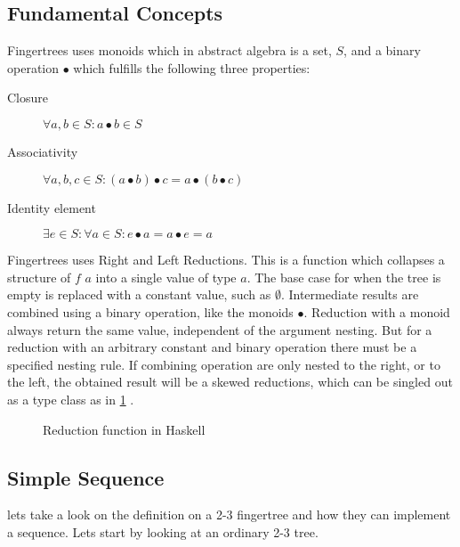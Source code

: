 \subsection{Fundamental Concepts}

Fingertrees uses monoids which in abstract algebra is a set, $S$, and a binary
operation $\bullet$ which fulfills the following
three properties:
\begin{description}
\item[Closure] $\forall a,b \in S: a \bullet b \in S$
\item[Associativity] $\forall a,b,c \in S: (a \bullet b) \bullet c = a \bullet
    (b \bullet c)$ 
\item[Identity element] $\exists e \in S: \forall a \in S: e \bullet a = a
    \bullet e = a$
\end{description}

Fingertrees uses Right and Left Reductions. This is a function which
collapses a structure of $f$ $a$ into a single value of type $a$. The base case
for when the tree is empty is replaced with a constant value, such as 
$\emptyset$. Intermediate results are combined using a binary operation, like
the monoids $\bullet$. Reduction with a monoid always return the same value,
independent of the argument nesting. But for a reduction with an arbitrary
constant and binary operation there must be a specified nesting rule. If
combining operation are only nested to the right, or to the left, the obtained
result will be a skewed reductions, which can be singled out as a type class as 
in \cref{fig:Reduction} \cite{fingertree}.

\begin{figure}[h!]

\caption{Reduction function in Haskell \label{fig:Reduction}}
\end{figure}

\subsection{Simple Sequence}
lets take a look on the definition on a 2-3 fingertree and how they can
implement a sequence. Lets start by looking at an ordinary 2-3 tree.

